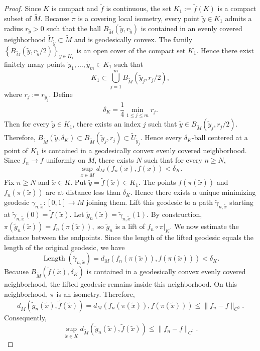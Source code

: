 \documentclass[11pt]{article}
\theoremstyle{definition}
\begin{document}
	\begin{proof}
		Since $K$ is compact and $\widetilde f$ is continuous, the set $K_1:=\widetilde
		f(K)$ is a compact subset of $\widetilde M$. Because $\pi$ is a covering local
		isometry, every point $\tilde y\in K_1$ admits a radius $r_{\tilde y}>0$ such
		that the ball $B_{\widetilde M}(\tilde y,r_{\tilde y})$ is contained in an
		evenly covered neighborhood $\widetilde U_{\tilde y}\subset\widetilde M$ and is
		geodesically convex. The family $\left\{ B_{\widetilde M}(\tilde y,r_{\tilde
			y}/2) \right\}_{\tilde y\in K_1}$ is an open cover of the compact set $K_1$.
		Hence there exist finitely many points $\tilde y_1,\ldots,\tilde y_m\in K_1$
		such that
		\[
		K_1\subset \bigcup_{j=1}^{m} B_{\widetilde M} (\tilde y_j,r_j/2),
		\]
		where $r_j:=r_{\tilde y_j}.$ Define
		\[
		\delta_K = \frac14\min_{1\le j\le m}r_j.
		\]
		Then for every $\tilde y\in K_1$, there exists an index $j$ such that $\tilde
		y\in B_{\widetilde M}(\tilde y_j,r_j/2).$ Therefore, $B_{\widetilde M}(\tilde
		y,\delta_K) \subset B_{\widetilde M}(\tilde y_j,r_j) \subset \widetilde
		U_{\tilde y_j}.$ Hence every $\delta_K$-ball centered at a point of $K_1$ is
		contained in a geodesically convex evenly covered neighborhood. Since $f_n\longrightarrow
		f$ uniformly on $M$, there exists $N$ such that for every $n\ge N$,
		\[
		\sup_{x\in M} d_M(f_n(x),f(x)) < \delta_K.
		\]
		Fix $n\ge N$ and $\tilde x\in K$. Put $\tilde y=\widetilde f(\tilde x)\in K_1.$
		The points $f(\pi(\tilde x))$ and $f_n(\pi(\tilde x))$ are at distance less than
		$\delta_K$. Hence there exists a unique minimizing geodesic $\gamma_{n,\tilde
			x}:[0,1]\to M$ joining them. Lift this geodesic to a path $\widetilde\gamma_{n,\tilde
			x}$ starting at $\widetilde\gamma_{n,\tilde x}(0) = \widetilde f(\tilde x).$
		Let $\widetilde g_n(\tilde x) = \widetilde\gamma_{n,\tilde x}(1).$ By
		construction, $\pi(\widetilde g_n(\tilde x)) = f_n(\pi(\tilde x)),$ so
		$\widetilde g_n$ is a lift of $f_n\circ\pi|_K.$ We now estimate the distance
		between the endpoints. Since the length of the lifted geodesic equals the length
		of the original geodesic, we have
		\[
		\operatorname{Length} (\widetilde\gamma_{n,\tilde x}) =
		d_M(f_n(\pi(\tilde x)),f(\pi(\tilde x))) < \delta_K.
		\]
		Because $B_{\widetilde M}(\widetilde f(\tilde x),\delta_K)$ is contained in a
		geodesically convex evenly covered neighborhood, the lifted geodesic remains
		inside this neighborhood. On this neighborhood, $\pi$ is an isometry. Therefore,
		\[
		d_{\widetilde M} (\widetilde g_n(\tilde x),\widetilde f(\tilde x)) =
		d_M(f_n(\pi(\tilde x)),f(\pi(\tilde x))) \le \|f_n-f\|_{C^0}.
		\]
		Consequently,
		\[
		\sup_{\tilde x\in K} d_{\widetilde M} (\widetilde g_n(\tilde x),\widetilde
		f(\tilde x)) \le \|f_n-f\|_{C^0}.
		\tag{a}
		\]
		

\end{proof}
\end{document}
